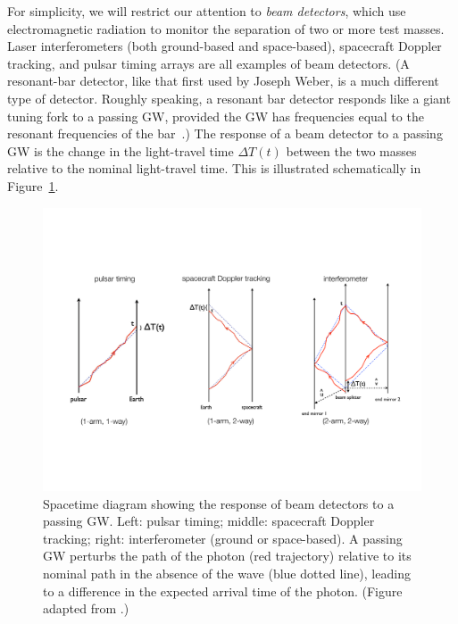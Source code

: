 For simplicity, we will restrict our attention to 
{\em beam detectors}, which use electromagnetic radiation
to monitor the separation of two or more test masses.
Laser interferometers (both ground-based and space-based),
spacecraft Doppler tracking, and pulsar timing arrays
are all examples of beam detectors.
(A resonant-bar detector, like that first used by
Joseph Weber, is a much different type of detector.
Roughly speaking, a resonant bar detector responds
like a giant tuning fork to a passing GW, provided
the GW has frequencies equal to the resonant frequencies 
of the bar~\cite{MTW:1973}.)
The response of a beam detector to a passing GW is 
the change in the light-travel time $\Delta T(t)$ 
between the two 
masses relative to the nominal light-travel time.
This is illustrated schematically in Figure~\ref{f:beam_detectors}.
%
\begin{figure}[htbp!]
\begin{center}
\includegraphics[width=\textwidth]{Figures/beam_detectors}
\caption{Spacetime diagram showing the response of beam
detectors to a passing GW.  
Left: pulsar timing; middle: spacecraft Doppler
tracking; right: interferometer (ground or space-based).
A passing GW perturbs the path of the photon (red trajectory) 
relative to its nominal path in the absence of the wave 
(blue dotted line), leading to a 
difference in the expected arrival time of the photon.
(Figure adapted from \cite{Romano-Cornish:2017}.)}
\label{f:beam_detectors}
\end{center}
\end{figure}
%

